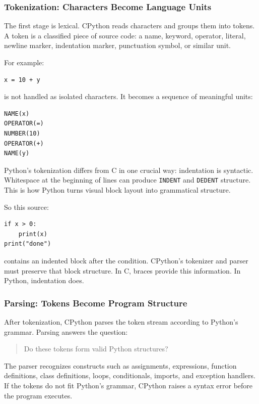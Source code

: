 \subsubsection{Tokenization: Characters Become Language Units}

The first stage is lexical. CPython reads characters and groups them into tokens. A token is a classified piece of source code: a name, keyword, operator, literal, newline marker, indentation marker, punctuation symbol, or similar unit.

For example:

\begin{verbatim}
x = 10 + y
\end{verbatim}

is not handled as isolated characters. It becomes a sequence of meaningful units:

\begin{verbatim}
NAME(x)
OPERATOR(=)
NUMBER(10)
OPERATOR(+)
NAME(y)
\end{verbatim}

Python's tokenization differs from C in one crucial way: indentation is syntactic. Whitespace at the beginning of lines can produce \texttt{INDENT} and \texttt{DEDENT} structure. This is how Python turns visual block layout into grammatical structure.

So this source:

\begin{verbatim}
if x > 0:
    print(x)
print("done")
\end{verbatim}

contains an indented block after the condition. CPython's tokenizer and parser must preserve that block structure. In C, braces provide this information. In Python, indentation does.

\subsubsection{Parsing: Tokens Become Program Structure}

After tokenization, CPython parses the token stream according to Python's grammar. Parsing answers the question:

\begin{quote}
Do these tokens form valid Python structures?
\end{quote}

The parser recognizes constructs such as assignments, expressions, function definitions, class definitions, loops, conditionals, imports, and exception handlers. If the tokens do not fit Python's grammar, CPython raises a syntax error before the program executes.

